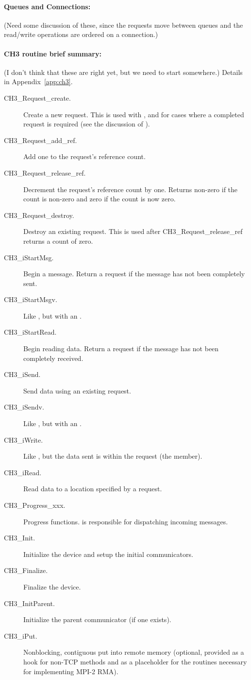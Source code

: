 \documentclass{article}
\def\mpids#1#2{\code{#2}\index{#1!#2}}
\begin{document}
\paragraph{Queues and Connections:}

(Need some discussion of these, since the requests move between queues and the 
read/write operations are ordered on a connection.)

\paragraph{CH3 routine brief summary:}

(I don't think that these are right yet, but we need to start somewhere.)
Details in Appendix~\ref{app:ch3}.

\begin{description}
\item[CH3\_Request\_create.]Create a new request. This is used with
  , and for cases where a completed request is required (see
  the discussion of ).
\item[CH3\_Request\_add\_ref.] Add one to the request's reference count.
\item[CH3\_Request\_release\_ref.]Decrement the request's reference count
   by one.  Returns non-zero if the count is non-zero and zero if the count
   is now zero.
\item[CH3\_Request\_destroy.]Destroy an existing request. This is used
after CH3\_Request\_release\_ref returns a count of zero.
\item[CH3\_iStartMsg.]Begin a message.  Return a request if the message has not
  been completely sent.
\item[CH3\_iStartMsgv.]Like , but with an .
\item[CH3\_iStartRead.]Begin reading data.  Return a request if the message has
  not been completely received.
\item[CH3\_iSend.]Send data using an existing request.
\item[CH3\_iSendv.]Like , but with an .
\item[CH3\_iWrite.]Like , but the data sent is within the
  request (the \mpids{MPID_Request}{active\_buf} member).
\item[CH3\_iRead.]Read data to a location specified by a request.
\item[CH3\_Progress\_xxx.]Progress functions.   is
  responsible for dispatching incoming messages.
\item[CH3\_Init.]Initialize the device and setup the initial communicators.
\item[CH3\_Finalize.]Finalize the device.
\item[CH3\_InitParent.]Initialize the parent communicator (if one exists).
\item[CH3\_iPut.]Nonblocking, contiguous put into remote memory (optional,
  provided as a hook for non-TCP methods and as a placeholder for the
  routines necessary for implementing MPI-2 RMA).
\end{description}
\end{document}
